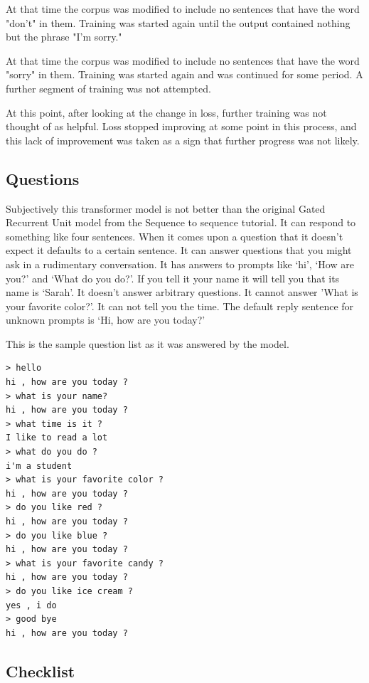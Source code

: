 At that time the corpus was modified to include no sentences that have the word "don't" in them. Training was started again until the output contained nothing but the phrase "I'm sorry." 

At that time the corpus was modified to include no sentences that have the word "sorry" in them. Training was started again and was continued for some period. A further segment of training was not attempted. 

At this point, after looking at the change in loss, further training was not thought of as helpful. Loss stopped improving at some point in this process, and this lack of improvement was taken as a sign that further progress was not likely.

\subsection{Questions}
Subjectively this transformer model is not better than the original Gated Recurrent Unit model from the Sequence to sequence tutorial. It can respond to something like four sentences. When it comes upon a question that it doesn't expect it defaults to a certain sentence. It can answer questions that you might ask in a rudimentary conversation. It has answers to prompts like `hi', `How are you?' and `What do you do?'. If you tell it your name it will tell you that its name is `Sarah'. It doesn't answer arbitrary questions. It cannot answer 'What is your favorite color?'. It can not tell you the time. The default reply sentence for unknown prompts is `Hi, how are you today?'

This is the sample question list as it was answered by the model.

\begin{verbatim}
> hello
hi , how are you today ?
> what is your name?
hi , how are you today ?
> what time is it ?
I like to read a lot
> what do you do ?
i'm a student
> what is your favorite color ?
hi , how are you today ?
> do you like red ?
hi , how are you today ?
> do you like blue ?
hi , how are you today ?
> what is your favorite candy ?
hi , how are you today ?
> do you like ice cream ?
yes , i do 
> good bye
hi , how are you today ?
\end{verbatim}

\subsection{Checklist}

